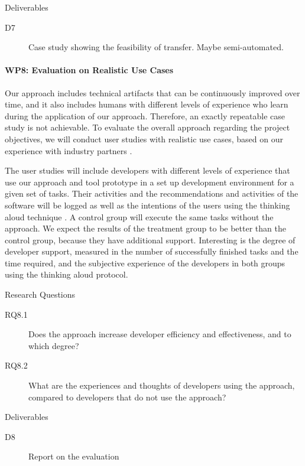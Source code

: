 Deliverables
\begin{description}
	\item[D7] Case study showing the feasibility of transfer. Maybe semi-automated. 
\end{description}

\paragraph*{WP8: Evaluation on Realistic Use Cases}
Our approach includes technical artifacts that can be continuously improved over time, and it also includes humans with different levels of experience who learn during the application of our approach. Therefore, an exactly repeatable case study is not achievable. To evaluate the overall approach regarding the project objectives, we will conduct user studies with realistic use cases, based on our experience with industry partners .

The user studies will include developers with different levels of experience that use our approach and tool prototype in a set up development environment for a given set of tasks. Their activities and the recommendations and activities of the software will be logged as well as the intentions of the users using the thinking aloud technique \cite{thinkingAloud}. A control group will execute the same tasks without the approach. We expect the results of the treatment group to be better than the control group, because they have additional support. Interesting is the degree of developer support, measured in the number of successfully finished tasks and the time required, and the subjective experience of the developers in both groups using the thinking aloud protocol.

Research Questions
\begin{description}
	\item[RQ8.1]	Does the approach increase developer efficiency and effectiveness, and to which degree?
	\item[RQ8.2]	What are the experiences and thoughts of developers using the approach, compared to developers that do not use the approach?
\end{description}

Deliverables
\begin{description}
	\item[D8] Report on the evaluation
\end{description}

